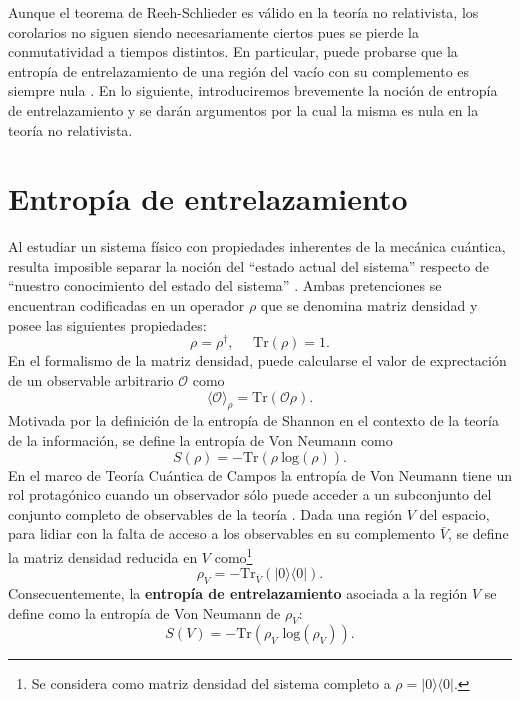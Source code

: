 Aunque el teorema de Reeh-Schlieder es válido en la teoría no relativista, los corolarios no siguen siendo necesariamente ciertos pues se pierde la conmutatividad a tiempos distintos. En particular, puede probarse que la entropía de entrelazamiento de una región del vacío con su complemento es siempre nula \cite{Hason:2017flq}. En lo siguiente, introduciremos brevemente la noción de entropía de entrelazamiento y se darán argumentos por la cual la misma es nula en la teoría no relativista.


\section{Entropía de entrelazamiento}
Al estudiar un sistema físico con propiedades inherentes de la mecánica cuántica, resulta imposible separar la noción del “estado actual del sistema” respecto de “nuestro conocimiento del estado del sistema” \cite{Headrick:2019eth}. Ambas pretenciones se encuentran codificadas en un operador $\rho$ que se denomina matriz densidad y posee las siguientes propiedades:
\begin{equation}
\rho=\rho^{\dag},\:\:\:\:\:\: \text{Tr}(\rho)=1.
\end{equation}
En el formalismo de la matriz densidad, puede calcularse el  valor de exprectación de un observable arbitrario $\mathcal{O}$ como
\begin{equation}
\langle \mathcal{O} \rangle_{\rho} = \text{Tr}(\mathcal{O} \rho).
\label{eq:val_expect}
\end{equation}
Motivada por la definición de la entropía de Shannon en el contexto de la teoría de la información, se define la entropía de Von Neumann como
\begin{equation}
S(\rho)=-\text{Tr}(\rho \:\text{log}(\rho)).
\label{eq:EE_form}
\end{equation}
En el marco de Teoría Cuántica de Campos la entropía de Von Neumann tiene un rol protagónico cuando un observador sólo puede acceder a un subconjunto del conjunto completo de observables de la teoría \cite{Casini:2009sr}. Dada una región $V$ del espacio, para lidiar con la falta de acceso a los observables en su complemento $\bar{V}$, se define la matriz densidad reducida en $V$ como\footnote{Se considera como matriz densidad del sistema completo a $\rho=|0\rangle \langle 0|$.}
\begin{equation}
\rho_V=-\text{Tr}_{\bar{V}}(|0\rangle \langle 0|).
\label{eq:rho_red}
\end{equation} 
Consecuentemente, la \textbf{entropía de entrelazamiento} asociada a la región $V$ se define como la entropía de Von Neumann de $\rho_V$:
\begin{equation}
S(V)=-\text{Tr}(\rho_V \text{ log}(\rho_V)).
\label{ec:def_EE}
\end{equation}
